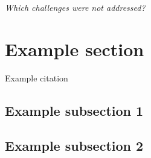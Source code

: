 \documentclass[11pt]{article}
\begin{document}
\begin{flushleft}
		\textit{Which challenges were not addressed?}
		
		\section{Example section}
		
		Example citation \cite{neuman2009challenges}
		
		\subsection{Example subsection 1}
		
		\subsection{Example subsection 2}
		
		\newpage
		
		
		
		
		
		
	\end{flushleft}
	
\end{document}
